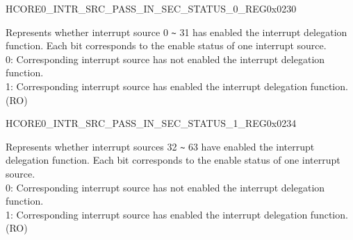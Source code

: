 \begin{register}{H}{CORE0\_INTR\_SRC\_PASS\_IN\_SEC\_STATUS\_0\_REG}{0x0230}\label{regdesc:CORE0INTRSRCPASSINSECSTATUS0REG}
%
\regnewline%
\begin{regdesc}\begin{reglist}
\label{fielddesc:CORE0INTRSRCPASSINSECSTATUS0}\item [CORE0\_INTR\_SRC\_PASS\_IN\_SEC\_STATUS\_0] Represents whether interrupt source 0 \verb+~+ 31 has enabled the interrupt delegation function. Each bit corresponds to the enable status of one interrupt source.\\
0: Corresponding interrupt source has not enabled the interrupt delegation function. \\
1: Corresponding interrupt source has enabled the interrupt delegation function. \\
(RO)
\end{reglist}\end{regdesc}
\end{register}

\begin{register}{H}{CORE0\_INTR\_SRC\_PASS\_IN\_SEC\_STATUS\_1\_REG}{0x0234}\label{regdesc:CORE0INTRSRCPASSINSECSTATUS1REG}
%
\regnewline%
\begin{regdesc}\begin{reglist}
\label{fielddesc:CORE0INTRSRCPASSINSECSTATUS1}\item [CORE0\_INTR\_SRC\_PASS\_IN\_SEC\_STATUS\_1] Represents whether interrupt sources 32 \verb+~+ 63 have enabled the interrupt delegation function. Each bit corresponds to the enable status of one interrupt source.\\
0: Corresponding interrupt source has not enabled the interrupt delegation function.\\
1: Corresponding interrupt source has enabled the interrupt delegation function. \\
(RO)
\end{reglist}\end{regdesc}
\end{register}

